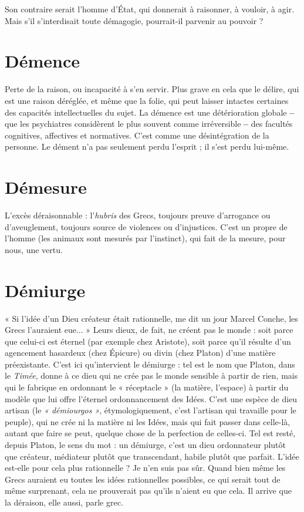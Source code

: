Son contraire serait l’homme d’État, qui donnerait à raisonner, à vouloir, à
agir. Mais s’il s’interdisait toute démagogie, pourrait-il parvenir au pouvoir ?

\section{Démence}
Perte de la raison, ou incapacité à s’en servir. Plus grave en cela
que le délire, qui est une raison déréglée, et même que la folie,
qui peut laisser intactes certaines des capacités intellectuelles du sujet. La
démence est une détérioration globale {\bf --} que les psychiatres considèrent le plus
souvent comme irréversible {\bf --} des facultés cognitives, affectives et normatives.
C’est comme une désintégration de la personne. Le dément n’a pas seulement
perdu l'esprit ; il s’est perdu lui-même.

\section{Démesure}
L’excès déraisonnable : l’{\it hubris} des Grecs, toujours preuve d’arrogance
ou d’aveuglement, toujours source de violences ou
d’injustices. C’est un propre de l’homme (les animaux sont mesurés par l’instinct),
qui fait de la mesure, pour nous, une vertu.

\section{Démiurge}
« Si l’idée d’un Dieu créateur était rationnelle, me dit un jour
Marcel Conche, les Grecs l’auraient eue... » Leurs dieux, de
fait, ne créent pas le monde : soit parce que celui-ci est éternel (par exemple
chez Aristote), soit parce qu’il résulte d’un agencement hasardeux (chez Épicure)
ou divin (chez Platon) d’une matière préexistante. C’est ici qu’intervient
le démiurge : tel est le nom que Platon, dans le {\it Timée}, donne à ce dieu qui ne
crée pas le monde sensible à partir de rien, mais qui le fabrique en ordonnant
le « réceptacle » (la matière, l’espace) à partir du modèle que lui offre l’éternel
ordonnancement des Idées. C’est une espèce de dieu artisan (le {\it « démiourgos »},
étymologiquement, c’est l'artisan qui travaille pour le peuple), qui ne crée ni la
matière ni les Idées, mais qui fait passer dans celle-là, autant que faire se peut,
quelque chose de la perfection de celles-ci. Tel est resté, depuis Platon, le sens
du mot : un démiurge, c’est un dieu ordonnateur plutôt que créateur, médiateur
plutôt que transcendant, habile plutôt que parfait. L'idée est-elle pour cela
plus rationnelle ? Je n’en suis pas sûr. Quand bien même les Grecs auraient eu
toutes les idées rationnelles possibles, ce qui serait tout de même surprenant,
cela ne prouverait pas qu’ils n’aient eu que cela. Il arrive que la déraison, elle
aussi, parle grec.

